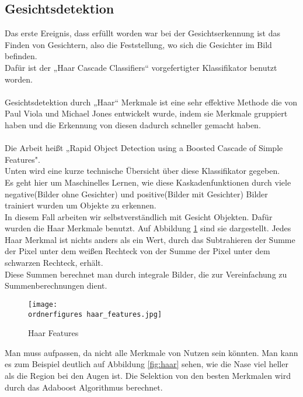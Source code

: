 \subsection{Gesichtsdetektion}

Das erste Ereignis, dass erfüllt worden war bei der Gesichtserkennung ist das Finden von Gesichtern, also die Feststellung, wo sich die Gesichter im Bild befinden. \\ 
Dafür ist der „Haar Cascade Classifiers“ vorgefertigter Klassifikator benutzt worden. \\ \\
Gesichtsdetektion durch „Haar“ Merkmale ist eine sehr effektive Methode die von Paul Viola und Michael Jones entwickelt wurde, indem sie Merkmale gruppiert haben und die Erkennung von diesen dadurch schneller gemacht haben. \\ \\
Die Arbeit heißt „Rapid Object Detection using a Boosted Cascade of Simple Features". \cite{Viola01robustreal-time}\\


Unten wird eine kurze technische Übersicht über diese Klassifikator gegeben.\\
\justify
Es geht hier um Maschinelles Lernen, wie diese Kaskadenfunktionen durch viele negative(Bilder ohne Gesichter) und positive(Bilder mit Gesichter) Bilder trainiert wurden um Objekte zu erkennen.\\ 
In diesem Fall  arbeiten wir selbstverständlich mit Gesicht Objekten. 
Dafür wurden die Haar Merkmale benutzt. Auf Abbildung \ref{fig:haar features} sind sie dargestellt. Jedes Haar Merkmal ist nichts anders als ein Wert, durch das Subtrahieren der Summe der Pixel unter dem weißen Rechteck von der Summe der Pixel unter dem schwarzen Rechteck, erhält. \\
Diese Summen berechnet man durch integrale Bilder, die zur Vereinfachung zu Summenberechnungen dient. 

\begin{figure}
	\centering
	\texttt{[image: \\ordnerfigures haar\_features.jpg]}
	\caption{ Haar Features\cite{Viola01robustreal-time}}
	\label{fig:haar features}
\end{figure}

Man muss aufpassen, da nicht alle Merkmale von Nutzen sein könnten. Man kann es zum Beispiel deutlich auf Abbildung \ref*{fig:haar} sehen, wie die Nase viel heller als die Region bei den Augen ist. Die Selektion von den besten Merkmalen wird durch das Adaboost Algorithmus berechnet. 



